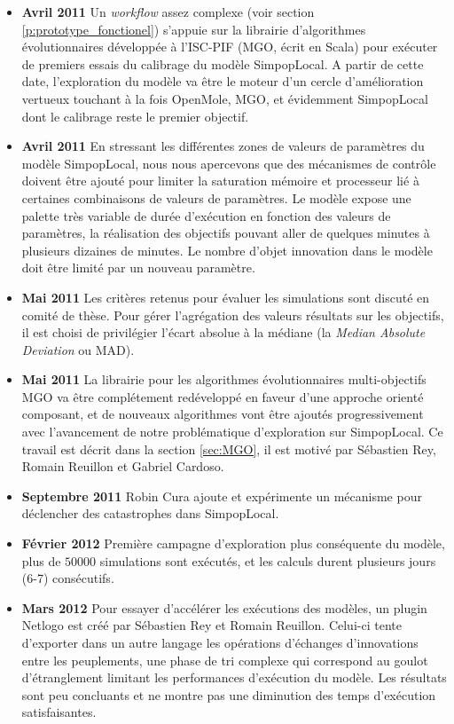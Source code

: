 \begin{itemize}[label=\textbullet]
\item {\textbf{Avril 2011}} Un \textit{workflow} assez complexe (voir section \ref{p:prototype_fonctionel}) s'appuie sur la librairie d'algorithmes évolutionnaires développée à l'ISC-PIF (MGO, écrit en Scala) pour exécuter de premiers essais du calibrage du modèle SimpopLocal. A partir de cette date, l'exploration du modèle va être le moteur d'un cercle d'amélioration vertueux touchant à la fois OpenMole, MGO, et évidemment SimpopLocal dont le calibrage reste le premier objectif. 

\item {\textbf{Avril 2011}} En stressant les différentes zones de valeurs de paramètres du modèle SimpopLocal, nous nous apercevons que des mécanismes de contrôle doivent être ajouté pour limiter la saturation mémoire et processeur lié à certaines combinaisons de valeurs de paramètres. Le modèle expose une palette très variable de durée d'exécution en fonction des valeurs de paramètres, la réalisation des objectifs pouvant aller de quelques minutes à plusieurs dizaines de minutes. Le nombre d'objet innovation dans le modèle doit être limité par un nouveau paramètre. 

\item{\textbf{Mai 2011}} Les critères retenus pour évaluer les simulations sont discuté en comité de thèse. Pour gérer l'agrégation des valeurs résultats sur les objectifs, il est choisi de privilégier l'écart absolue à la médiane (la \textit{Median Absolute Deviation} ou MAD). 

\item {\textbf{Mai 2011}} La librairie pour les algorithmes évolutionnaires multi-objectifs MGO va être complétement redéveloppé en faveur d'une approche orienté composant, et de nouveaux algorithmes vont être ajoutés progressivement avec l'avancement de notre problématique d'exploration sur SimpopLocal. Ce travail est décrit dans la section \ref{sec:MGO}, il est motivé par Sébastien Rey, Romain Reuillon et Gabriel Cardoso. 

\item {\textbf{Septembre 2011}} Robin Cura ajoute et expérimente un mécanisme pour déclencher des catastrophes dans SimpopLocal.

\item {\textbf{Février 2012}} Première campagne d'exploration plus conséquente du modèle, plus de $\num{50000}$ simulations sont exécutés, et les calculs durent plusieurs jours (6-7) consécutifs.

\item {\textbf{Mars 2012}} Pour essayer d'accélérer les exécutions des modèles, un plugin Netlogo est créé par Sébastien Rey et Romain Reuillon. Celui-ci tente d'exporter dans un autre langage les opérations d'échanges d'innovations entre les peuplements, une phase de tri complexe qui correspond au goulot d'étranglement limitant les performances d'exécution du modèle. Les résultats sont peu concluants et ne montre pas une diminution des temps d'exécution satisfaisantes.


\end{itemize}
